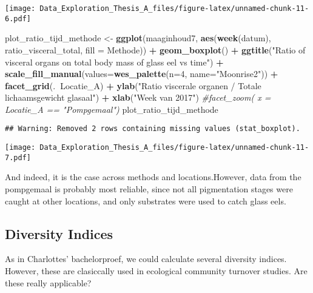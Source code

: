 \documentclass[]{article}
\newenvironment{Shaded}{\begin{snugshade}}{\end{snugshade}}
\newcommand{\KeywordTok}[1]{\textcolor[rgb]{0.13,0.29,0.53}{\textbf{#1}}}
\newcommand{\DataTypeTok}[1]{\textcolor[rgb]{0.13,0.29,0.53}{#1}}
\newcommand{\DecValTok}[1]{\textcolor[rgb]{0.00,0.00,0.81}{#1}}
\newcommand{\StringTok}[1]{\textcolor[rgb]{0.31,0.60,0.02}{#1}}
\newcommand{\CommentTok}[1]{\textcolor[rgb]{0.56,0.35,0.01}{\textit{#1}}}
\newcommand{\OperatorTok}[1]{\textcolor[rgb]{0.81,0.36,0.00}{\textbf{#1}}}
\newcommand{\NormalTok}[1]{#1}
\begin{document}
\texttt{[image: Data\_Exploration\_Thesis\_A\_files/figure-latex/unnamed-chunk-11-6.pdf]}

\begin{Shaded}
\begin{Highlighting}[]
\NormalTok{plot_ratio_tijd_methode <-}\StringTok{ }\KeywordTok{ggplot}\NormalTok{(maaginhoud7, }\KeywordTok{aes}\NormalTok{(}\KeywordTok{week}\NormalTok{(datum), ratio_visceral_total, }\DataTypeTok{fill =}\NormalTok{ Methode)) }\OperatorTok{+}
\StringTok{  }\KeywordTok{geom_boxplot}\NormalTok{() }\OperatorTok{+}
\StringTok{  }\KeywordTok{ggtitle}\NormalTok{(}\StringTok{"Ratio of visceral organs on total body mass of glass eel vs time"}\NormalTok{) }\OperatorTok{+}
\StringTok{  }\KeywordTok{scale_fill_manual}\NormalTok{(}\DataTypeTok{values=}\KeywordTok{wes_palette}\NormalTok{(}\DataTypeTok{n=}\DecValTok{4}\NormalTok{, }\DataTypeTok{name=}\StringTok{"Moonrise2"}\NormalTok{)) }\OperatorTok{+}\StringTok{ }
\StringTok{  }\KeywordTok{facet_grid}\NormalTok{(.}\OperatorTok{~}\NormalTok{Locatie_A) }\OperatorTok{+}
\StringTok{  }\KeywordTok{ylab}\NormalTok{(}\StringTok{"Ratio viscerale organen / Totale lichaamsgewicht glasaal"}\NormalTok{) }\OperatorTok{+}
\StringTok{  }\KeywordTok{xlab}\NormalTok{(}\StringTok{"Week van 2017"}\NormalTok{)}
  \CommentTok{#facet_zoom( x = Locatie_A == "Pompgemaal")}
\NormalTok{plot_ratio_tijd_methode}
\end{Highlighting}
\end{Shaded}

\begin{verbatim}
## Warning: Removed 2 rows containing missing values (stat_boxplot).
\end{verbatim}

\texttt{[image: Data\_Exploration\_Thesis\_A\_files/figure-latex/unnamed-chunk-11-7.pdf]}

And indeed, it is the case across methods and locations.However, data
from the pompgemaal is probably most reliable, since not all
pigmentation stages were caught at other locations, and only substrates
were used to catch glass eels.

\subsection{Diversity Indices}\label{diversity-indices}

As in Charlottes' bachelorproef, we could calculate several diversity
indices. However, these are clasiccally used in ecological community
turnover studies. Are these really applicable?
\end{document}
